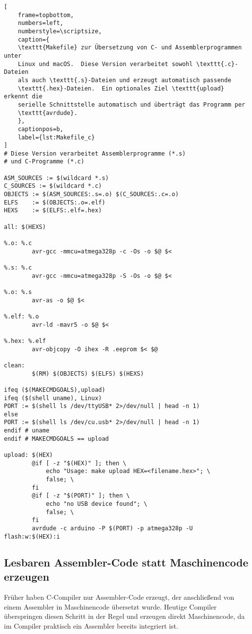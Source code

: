 \documentclass[a4paper,12pt]{article}
\begin{document}
\begin{listing}[htbp]
\begin{lstlisting}[
    frame=topbottom,
    numbers=left,
    numberstyle=\scriptsize,
    caption={
	\texttt{Makefile} zur Übersetzung von C- und Assemblerprogrammen unter
	Linux und macOS.  Diese Version verarbeitet sowohl \texttt{.c}-Dateien
	als auch \texttt{.s}-Dateien und erzeugt automatisch passende
	\texttt{.hex}-Dateien.  Ein optionales Ziel \texttt{upload} erkennt die
	serielle Schnittstelle automatisch und überträgt das Programm per
	\texttt{avrdude}.
    },
    captionpos=b,
    label={lst:Makefile_c}
]
# Diese Version verarbeitet Assemblerprogramme (*.s)
# und C-Programme (*.c)

ASM_SOURCES := $(wildcard *.s)
C_SOURCES := $(wildcard *.c)
OBJECTS := $(ASM_SOURCES:.s=.o) $(C_SOURCES:.c=.o)
ELFS    := $(OBJECTS:.o=.elf)
HEXS    := $(ELFS:.elf=.hex)

all: $(HEXS)

%.o: %.c
        avr-gcc -mmcu=atmega328p -c -Os -o $@ $<

%.s: %.c
        avr-gcc -mmcu=atmega328p -S -Os -o $@ $<

%.o: %.s
        avr-as -o $@ $<

%.elf: %.o
        avr-ld -mavr5 -o $@ $<

%.hex: %.elf
        avr-objcopy -O ihex -R .eeprom $< $@

clean:
        $(RM) $(OBJECTS) $(ELFS) $(HEXS)

ifeq ($(MAKECMDGOALS),upload)
ifeq ($(shell uname), Linux)
PORT := $(shell ls /dev/ttyUSB* 2>/dev/null | head -n 1)
else
PORT := $(shell ls /dev/cu.usb* 2>/dev/null | head -n 1)
endif # uname
endif # MAKECMDGOALS == upload

upload: $(HEX)
        @if [ -z "$(HEX)" ]; then \
            echo "Usage: make upload HEX=<filename.hex>"; \
            false; \
        fi
        @if [ -z "$(PORT)" ]; then \
            echo "no USB device found"; \
            false; \
        fi
        avrdude -c arduino -P $(PORT) -p atmega328p -U flash:w:$(HEX):i
\end{lstlisting}
\end{listing}

\subsection{Lesbaren Assembler-Code statt Maschinencode erzeugen}

Früher haben C-Compiler nur Assembler-Code erzeugt, der anschließend von einem
Assembler in Maschinencode übersetzt wurde. Heutige Compiler überspringen
diesen Schritt in der Regel und erzeugen direkt Maschinencode, da im Compiler
praktisch ein Assembler bereits integriert ist.
\end{document}
